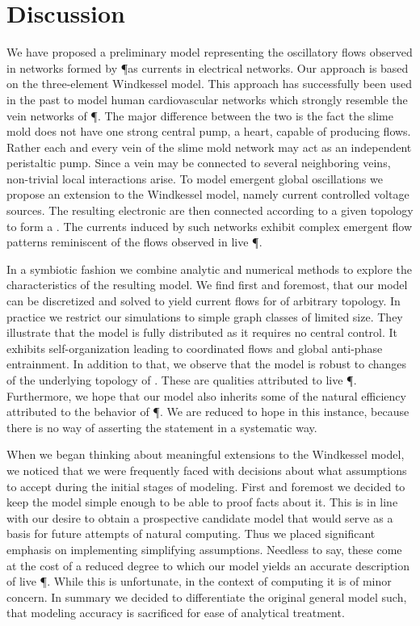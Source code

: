 \section{Discussion}

	We have proposed a preliminary model representing the oscillatory flows observed in networks formed by \P as currents in electrical networks. Our approach is based on the three-element Windkessel model. This approach has successfully been used in the past to model human cardiovascular networks which strongly resemble the vein networks of \P. The major difference between the two is the fact the slime mold does not have one strong central pump, \ie a heart, capable of producing flows. Rather each and every vein of the slime mold network may act as an independent peristaltic pump. Since a vein may be connected to several neighboring veins, non-trivial local interactions arise. To model emergent global oscillations we propose an extension to the Windkessel model, namely current controlled voltage sources. The resulting electronic \Pes are then connected according to a given topology to form a \Pn. The currents induced by such networks exhibit complex emergent flow patterns reminiscent of the flows observed in live \P.

	In a symbiotic fashion we combine analytic and numerical methods to explore the characteristics of the resulting model. We find first and foremost, that our model can be discretized and solved to yield current flows for \Pn of arbitrary topology. In practice we restrict our simulations to simple graph classes of limited size. They illustrate that the model is fully distributed as it requires no central control. It exhibits self-organization leading to coordinated flows and global anti-phase entrainment. In addition to that, we observe that the model is robust to changes of the underlying topology of \Pns. These are qualities attributed to live \P. Furthermore, we hope that our model also inherits some of the natural efficiency attributed to the behavior of \P. We are reduced to hope in this instance, because there is no way of asserting the statement in a systematic way.

	When we began thinking about meaningful extensions to the Windkessel model, we noticed that we were frequently faced with decisions about what assumptions to accept during the initial stages of modeling. First and foremost we decided to keep the model simple enough to be able to proof facts about it. This is in line with our desire to obtain a prospective candidate model that would serve as a basis for future attempts of natural computing. Thus we placed significant emphasis on implementing simplifying assumptions. Needless to say, these come at the cost of a reduced degree to which our model yields an accurate description of live \P. While this is unfortunate, in the context of computing it is of minor concern. In summary we decided to differentiate the original general model such, that modeling accuracy is sacrificed for ease of analytical treatment.


